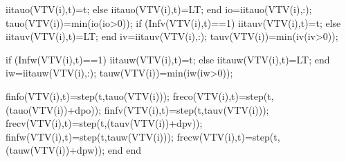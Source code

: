                                               iitauo(VTV(i),t)=t;                                              
                                          else
                                              iitauo(VTV(i),t)=LT;
                                          end
                                          io=iitauo(VTV(i),:);
                                          tauo(VTV(i))=min(io(io>0));
                                          if (Infv(VTV(i),t)==1)                                              
                                              iitauv(VTV(i),t)=t;                                           
                                          else
                                              iitauv(VTV(i),t)=LT;                                             
                                          end
                                          iv=iitauv(VTV(i),:);
                                          tauv(VTV(i))=min(iv(iv>0));
                                          
                                          if (Infw(VTV(i),t)==1)                                              
                                              iitauw(VTV(i),t)=t;                                           
                                          else
                                              iitauw(VTV(i),t)=LT;                                             
                                          end
                                          iw=iitauw(VTV(i),:);
                                          tauw(VTV(i))=min(iw(iw>0));
                                          
                                          finfo(VTV(i),t)=step(t,tauo(VTV(i))); %
                                          freco(VTV(i),t)=step(t,(tauo(VTV(i))+dpo)); %
                                          finfv(VTV(i),t)=step(t,tauv(VTV(i))); %
                                          frecv(VTV(i),t)=step(t,(tauv(VTV(i))+dpv)); %
                                          finfw(VTV(i),t)=step(t,tauw(VTV(i))); %
                                          frecw(VTV(i),t)=step(t,(tauw(VTV(i))+dpw)); %
                                    end
                               end 
                               
